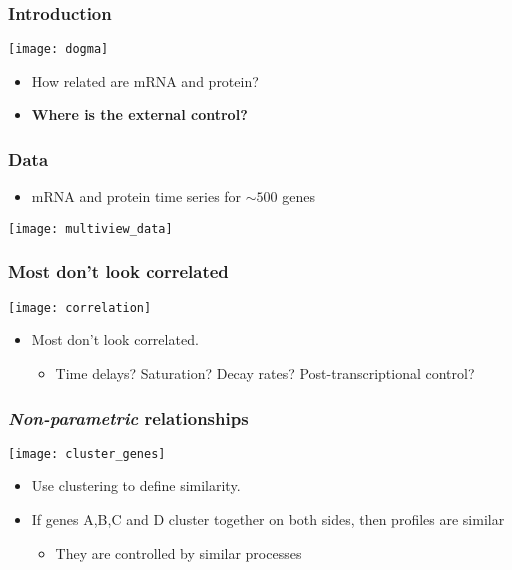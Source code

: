 
\begin{frame}
	\frametitle{Introduction}
	\texttt{[image: dogma]}
	\begin{itemize}
		\item How related are mRNA and protein?
		\item {\bf Where is the external control?}
	\end{itemize}
\end{frame}

\begin{frame}
	\frametitle{Data}
	\begin{itemize}
		\item mRNA and protein time series for $\sim 500$ genes
	\end{itemize}
	\texttt{[image: multiview\_data]}
\end{frame}

\begin{frame}
	\frametitle{Most don't look correlated}
	\texttt{[image: correlation]}
	\begin{itemize}
		\item Most don't look correlated.
		\begin{itemize}
			\item Time delays? Saturation? Decay rates? Post-transcriptional control?
		\end{itemize}
	\end{itemize}
\end{frame}

\begin{frame}
	\frametitle{\emph{Non-parametric} relationships}
	\texttt{[image: cluster\_genes]}
	\begin{itemize}
		\item Use clustering to define similarity.
		\item If genes A,B,C and D cluster together on both sides, then profiles are similar
		\begin{itemize}
			\item They are controlled by similar processes
		\end{itemize}
	\end{itemize}
\end{frame}

